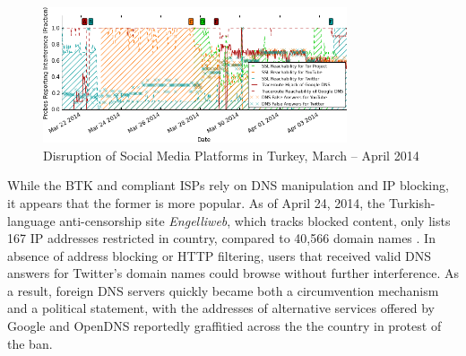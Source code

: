 \begin{figure}
  \centering
  \includegraphics[width=0.8\textwidth]{resources/tr-20140321-20140407-social_media_filtering.png}
  \caption{Disruption of Social Media Platforms in Turkey, March -- April 2014}
  \label{image:tr-social_media_filtering}
\end{figure}


While the BTK and compliant ISPs rely on DNS manipulation and IP blocking, it
appears that the former is more popular.  As of April 24, 2014, the
Turkish-language anti-censorship site \textit{Engelliweb}, which tracks
blocked content, only lists 167 IP addresses restricted in
country, compared to 40,566 domain names \cite{engelliweb}.
In absence of address blocking or HTTP filtering, users that received valid DNS
answers for Twitter's domain names could browse without further interference.
As a result, foreign DNS servers quickly became both a circumvention mechanism
and a political statement, with the addresses of alternative services offered
by Google and OpenDNS reportedly graffitied across the the country in protest
of the ban.

